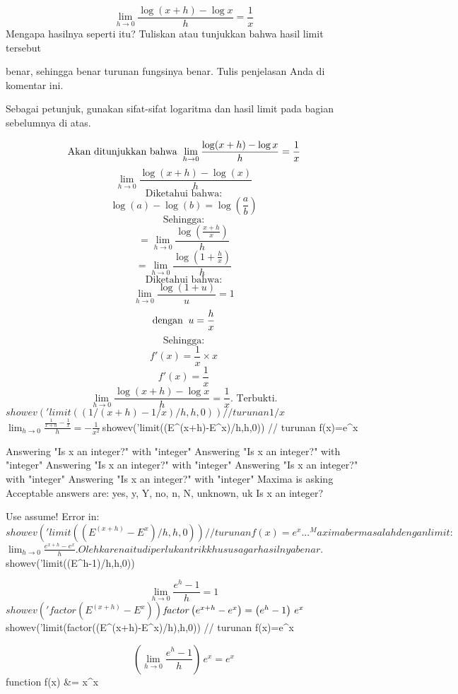 \documentclass{article}
\begin{document}
$$\lim_{h\rightarrow 0}{\frac{\log \left(x+h\right)-\log x}{h}}=
 \frac{1}{x}$$Mengapa hasilnya seperti itu? Tuliskan atau tunjukkan bahwa hasil
limit tersebut


benar, sehingga benar turunan fungsinya benar.  Tulis penjelasan Anda
di komentar ini.


Sebagai petunjuk, gunakan sifat-sifat logaritma dan hasil limit pada
bagian sebelumnya di atas.


$$\text{Akan ditunjukkan bahwa\: $\lim_{h\to 0} \frac{\log(x+h)-\log x}{h}=\frac {1}{x}$}$$$$\text{$\lim_{h\to 0} \frac{\log(x+h)-\log (x)}{h}$}$$$$\text{Diketahui bahwa:}$$$$\text{$\log(a)-\log(b)=\log(\frac{a}{b})$}$$$$\text{Sehingga:}$$$$\text{$=\lim_{h\to 0} \frac{\log\left(\frac{x+h}{x}\right)}{h}$}$$$$\text{$=\lim_{h\to 0} \frac{\log\left(1+\frac{h}{x}\right)}{h}$}$$$$\text{Diketahui bahwa:}$$$$\text{$\lim_{h\to 0} \frac{\log(1+u)}{u}=1$}$$$$\text{dengan\: $u=\frac{h}{x}$}$$$$\text{Sehingga:}$$$$\text{$f'(x)= \frac{1}{x}\times x $}$$$$\text{$f'(x)= \frac{1}{x}$}$$$$\text{$\lim_{h\to 0} \frac{\log(x+h)-\log x}{h}=\frac {1}{x}$. Terbukti.}$$\>$showev('limit((1/(x+h)-1/x)/h,h,0)) // turunan 1/x


$$\lim_{h\rightarrow 0}{\frac{\frac{1}{x+h}-\frac{1}{x}}{h}}=-\frac{1
 }{x^2}$$\>$showev('limit((E^(x+h)-E^x)/h,h,0)) // turunan f(x)=e^x


    Answering "Is x an integer?" with "integer"
    Answering "Is x an integer?" with "integer"
    Answering "Is x an integer?" with "integer"
    Answering "Is x an integer?" with "integer"
    Answering "Is x an integer?" with "integer"
    Maxima is asking
    Acceptable answers are: yes, y, Y, no, n, N, unknown, uk
    Is x an integer?
    
    Use assume!
    Error in:
    $showev('limit((E^(x+h)-E^x)/h,h,0)) // turunan f(x)=e^x ...
                                         ^

Maxima bermasalah dengan limit:


$$\lim_{h\to 0}\frac{e^{x+h}-e^x}{h}.$$Oleh karena itu diperlukan trik khusus agar hasilnya benar.


\>$showev('limit((E^h-1)/h,h,0))


$$\lim_{h\rightarrow 0}{\frac{e^{h}-1}{h}}=1$$\>$showev('factor(E^(x+h)-E^x))


$${\it factor}\left(e^{x+h}-e^{x}\right)=\left(e^{h}-1\right)\,e^{x}$$\>$showev('limit(factor((E^(x+h)-E^x)/h),h,0)) // turunan f(x)=e^x


$$\left(\lim_{h\rightarrow 0}{\frac{e^{h}-1}{h}}\right)\,e^{x}=e^{x}$$\>function f(x) &= x^x
\end{document}

